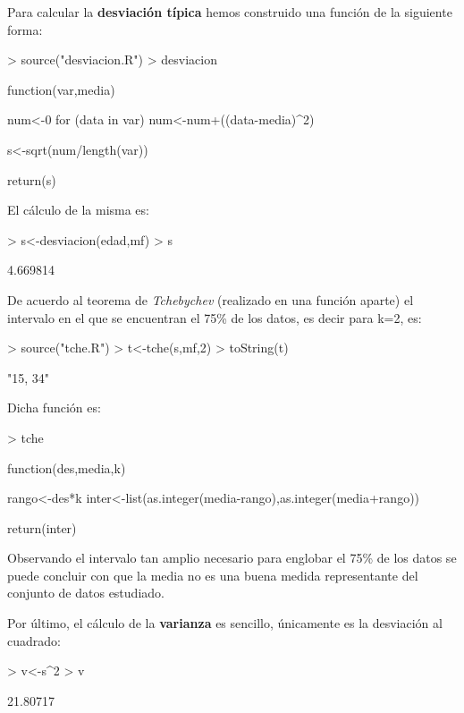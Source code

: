 \documentclass [a4paper] {article}
\begin{document}
\bigskip
Para calcular la \textbf{desviaci\'on t\'ipica} hemos construido una funci\'on de la siguiente
forma:
\begin{Schunk}
\begin{Sinput}
> source("desviacion.R")
> desviacion
\end{Sinput}
\begin{Soutput}
function(var,media) {
    num<-0
    for (data in var){
        num<-num+((data-media)^2)
    }

    s<-sqrt(num/length(var))

    return(s)
}
\end{Soutput}
\end{Schunk}

El c\'alculo de la misma es:
\begin{Schunk}
\begin{Sinput}
> s<-desviacion(edad,mf)
> s
\end{Sinput}
\begin{Soutput}
[1] 4.669814
\end{Soutput}
\end{Schunk}

\bigskip
De acuerdo al teorema de \textit{Tchebychev} (realizado en una funci\'on aparte) el intervalo en el que se encuentran el 75\%
de los datos, es decir para k=2, es:
\begin{Schunk}
\begin{Sinput}
> source("tche.R")
> t<-tche(s,mf,2)
> toString(t)
\end{Sinput}
\begin{Soutput}
[1] "15, 34"
\end{Soutput}
\end{Schunk}

Dicha funci\'on es:
\begin{Schunk}
\begin{Sinput}
> tche
\end{Sinput}
\begin{Soutput}
function(des,media,k) {
    
    rango<-des*k
    inter<-list(as.integer(media-rango),as.integer(media+rango))

    return(inter)
}
\end{Soutput}
\end{Schunk}

Observando el intervalo tan amplio necesario para englobar el 75\% de los datos se puede concluir con que la media
no es una buena medida representante del conjunto de datos estudiado.

\bigskip
Por \'ultimo, el c\'alculo de la \textbf{varianza} es sencillo, \'unicamente es la desviaci\'on al cuadrado:
\begin{Schunk}
\begin{Sinput}
> v<-s^2
> v
\end{Sinput}
\begin{Soutput}
[1] 21.80717
\end{Soutput}
\end{Schunk}
\end{document}
